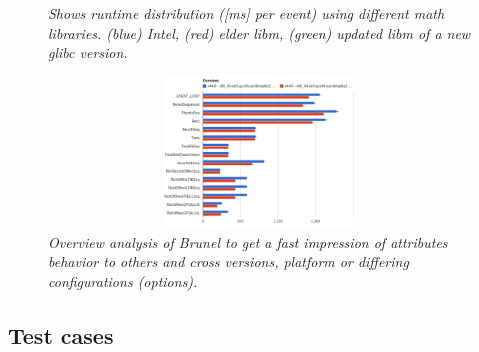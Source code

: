 \documentclass[a4paper]{jpconf}
\begin{document}
\begin{figure}[t]
\begin{minipage}[t]{0.3\textwidth}
\caption{\small \textit{Shows runtime distribution ([ms] per event) using different math libraries. (blue) Intel, (red) elder libm, (green) updated libm of a new glibc version.}}
\label{fig:brunel_basic_libm}
\end{minipage}\hspace{1pc}
\begin{minipage}[t]{0.35\textwidth}
\includegraphics[width=1\textwidth, height=4cm]{figures/brunel_overview_analysis.eps}
\caption{\small \textit{Overview analysis of Brunel to get a fast impression of attributes behavior to others and cross versions, platform or differing configurations (options).}}
\label{fig:brunel_overview}
\end{minipage}
\end{figure}

\subsection{Test cases}
\label{sec:test_cases}
\end{document}
